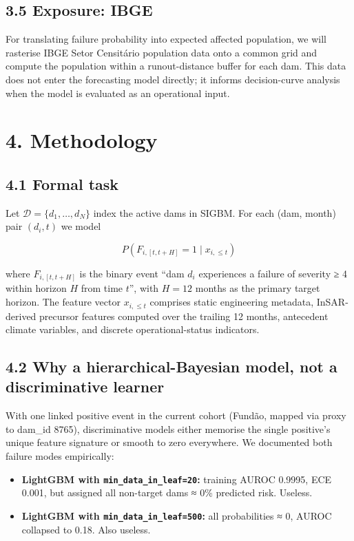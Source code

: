 \documentclass[
  11pt]{article}
\providecommand{\tightlist}{%
  \setlength{\itemsep}{0pt}\setlength{\parskip}{0pt}}
\begin{document}
\subsection{3.5 Exposure: IBGE}\label{exposure-ibge}

For translating failure probability into expected affected population,
we will rasterise IBGE Setor Censitário population data onto a common
grid and compute the population within a runout-distance buffer for each
dam. This data does not enter the forecasting model directly; it informs
decision-curve analysis when the model is evaluated as an operational
input.

\section{4. Methodology}\label{methodology}

\subsection{4.1 Formal task}\label{formal-task}

Let \(\mathcal{D} = \{d_1, \ldots, d_N\}\) index the active dams in
SIGBM. For each (dam, month) pair \((d_i, t)\) we model

\[P\!\left(F_{i, [t, t+H]} = 1 \mid x_{i, \le t}\right)\]

where \(F_{i,[t, t+H]}\) is the binary event ``dam \(d_i\) experiences a
failure of severity ≥ 4 within horizon \(H\) from time \(t\)'', with
\(H = 12\) months as the primary target horizon. The feature vector
\(x_{i, \le t}\) comprises static engineering metadata, InSAR-derived
precursor features computed over the trailing 12 months, antecedent
climate variables, and discrete operational-status indicators.

\subsection{4.2 Why a hierarchical-Bayesian model, not a discriminative
learner}\label{why-a-hierarchical-bayesian-model-not-a-discriminative-learner}

With one linked positive event in the current cohort (Fundão, mapped via
proxy to dam\_id 8765), discriminative models either memorise the single
positive's unique feature signature or smooth to zero everywhere. We
documented both failure modes empirically:

\begin{itemize}
\tightlist
\item
  \textbf{LightGBM with \texttt{min\_data\_in\_leaf=20}:} training AUROC
  0.9995, ECE 0.001, but assigned all non-target dams ≈ 0\% predicted
  risk. Useless.
\item
  \textbf{LightGBM with \texttt{min\_data\_in\_leaf=500}:} all
  probabilities ≈ 0, AUROC collapsed to 0.18. Also useless.
\end{itemize}
\end{document}
